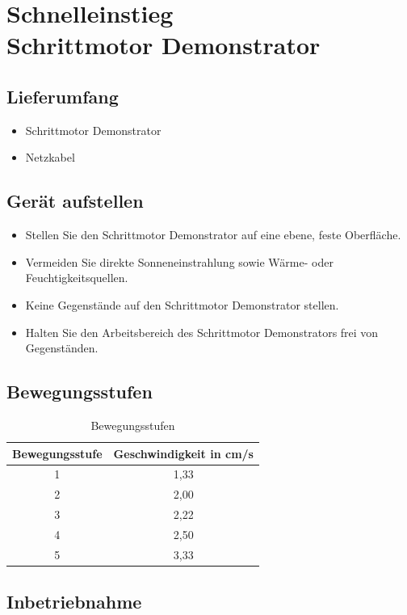 \documentclass[12pt,a4paper]{scrbook}
\begin{document}
 \chapter{Schnelleinstieg\\Schrittmotor Demonstrator}
	    \vspace{0.5cm}
	\section{Lieferumfang}
	
	\begin{itemize}
		\item Schrittmotor Demonstrator
		\item Netzkabel
	\end{itemize}

	\section{Gerät aufstellen}
	\begin{itemize}
		\item Stellen Sie den Schrittmotor Demonstrator auf eine ebene, feste Oberfläche.
		\item Vermeiden Sie direkte Sonneneinstrahlung sowie Wärme- oder Feuchtigkeitsquellen.
		\item Keine Gegenstände auf den Schrittmotor Demonstrator stellen.
		\item Halten Sie den Arbeitsbereich des Schrittmotor Demonstrators frei von Gegenständen.
	\end{itemize}
		\section{Bewegungsstufen}

\begin{table}[htpb]
	\centering
	\begin{tabular}{|c|c|}
		\hline
		\textbf{Bewegungsstufe} & \textbf{Geschwindigkeit in cm/s} \\
		\hline
		1 & 1,33 \\
		2 & 2,00 \\
		3 & 2,22 \\
		4 & 2,50 \\
		5 & 3,33 \\
		\hline
	\end{tabular}
	\caption{Bewegungsstufen}
	\label{tab:Bewegungsstufen}
\end{table}

	\section{Inbetriebnahme}
	
\end{document}
